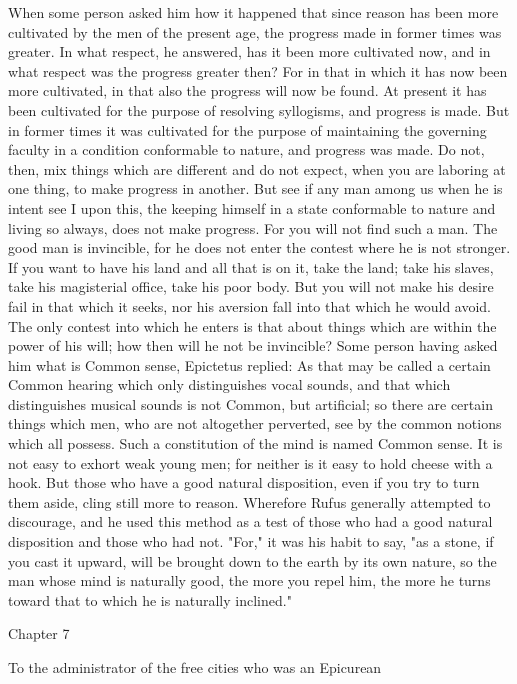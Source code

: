 \documentclass[a4paper]{article}
\begin{document}
    When some person asked him how it happened that since reason has been more
cultivated by the men of the present age, the progress made in former times was
greater. In what respect, he answered, has it been more cultivated now, and in
what respect was the progress greater then? For in that in which it has now
been more cultivated, in that also the progress will now be found. At present
it has been cultivated for the purpose of resolving syllogisms, and progress is
made. But in former times it was cultivated for the purpose of maintaining the
governing faculty in a condition conformable to nature, and progress was made.
Do not, then, mix things which are different and do not expect, when you are
laboring at one thing, to make progress in another. But see if any man among us
when he is intent see I upon this, the keeping himself in a state conformable
to nature and living so always, does not make progress. For you will not find
such a man.
    The good man is invincible, for he does not enter the contest where he is
not stronger. If you want to have his land and all that is on it, take the
land; take his slaves, take his magisterial office, take his poor body. But you
will not make his desire fail in that which it seeks, nor his aversion fall
into that which he would avoid. The only contest into which he enters is that
about things which are within the power of his will; how then will he not be
invincible?
    Some person having asked him what is Common sense, Epictetus replied: As
that may be called a certain Common hearing which only distinguishes vocal
sounds, and that which distinguishes musical sounds is not Common, but
artificial; so there are certain things which men, who are not altogether
perverted, see by the common notions which all possess. Such a constitution of
the mind is named Common sense.
    It is not easy to exhort weak young men; for neither is it easy to hold
cheese with a hook. But those who have a good natural disposition, even if you
try to turn them aside, cling still more to reason. Wherefore Rufus generally
attempted to discourage, and he used this method as a test of those who had a
good natural disposition and those who had not. "For," it was his habit to say,
"as a stone, if you cast it upward, will be brought down to the earth by its
own nature, so the man whose mind is naturally good, the more you repel him,
the more he turns toward that to which he is naturally inclined."

Chapter 7

To the administrator of the free cities who was an Epicurean
\end{document}
